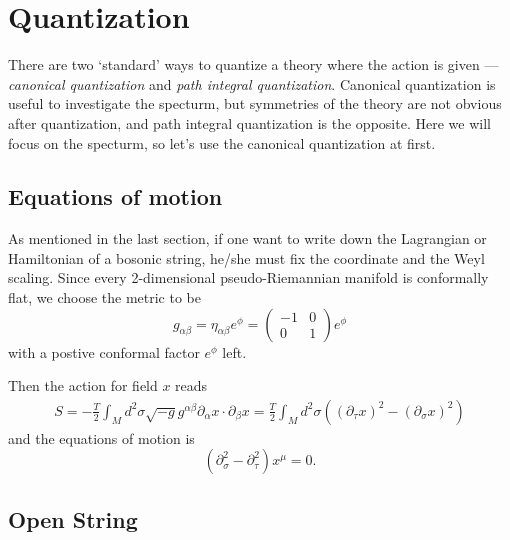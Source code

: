 \section{Quantization}

There are two `standard' ways to quantize a theory where
the action is given --- \textit{canonical quantization}
and \textit{path integral quantization}. 
Canonical quantization is useful to investigate the 
specturm, but symmetries of the theory are not obvious
after quantization, and path integral
quantization is the opposite. Here we will focus on the
specturm, so let's use the canonical quantization at first.

\subsection{Equations of motion}

As mentioned in the last section, if one want to write 
down the Lagrangian or Hamiltonian of a bosonic string,
he/she must fix the coordinate and the Weyl scaling. 
Since every 2-dimensional pseudo-Riemannian manifold is 
conformally flat, we choose the metric to be
\[
	g_{\alpha\beta}=\eta_{\alpha\beta}e^\phi=
	\begin{pmatrix}
		-1&0\\
		0&1
	\end{pmatrix}
	e^\phi
\]
with a postive conformal factor $e^\phi$ left.

Then the action for field $x$ reads
\begin{align*}
S=-\frac{T}{2} \int_M d^2\sigma \sqrt{-g}
g^{\alpha\beta}\partial_\alpha x\cdot \partial_\beta x
=\frac{T}{2}\int_M d^2\sigma ((\partial_\tau x)^2-
(\partial_\sigma x)^2)
\end{align*}
and the equations of motion is
\[
(\partial_\sigma^2-\partial_\tau^2)x^\mu=0.
\]


\subsection{Open String}


